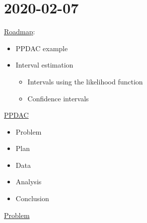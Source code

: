 \section{2020-02-07}
\underline{Roadmap}:
\begin{itemize}
    \item PPDAC example
    \item Interval estimation
          \begin{itemize}
              \item Intervals using the likelihood function
              \item Confidence intervals
          \end{itemize}
\end{itemize}
\underline{PPDAC}
\begin{itemize}
    \item Problem
    \item Plan
    \item Data
    \item Analysis
    \item Conclusion
\end{itemize}
\underline{Problem}
